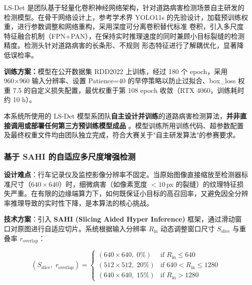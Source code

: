 \documentclass[UTF8, a4paper, fontset=ubuntu]{ctexart}
\begin{document}
  LS-Det 是团队基于轻量化卷积神经网络架构，针对道路病害检测场景自主研发的检测模型。在骨干网络设计上，参考学术界 YOLO11s 的先验设计\cite{lin2026yolo11wlbs}\cite{ultralytics2024}，加载预训练权重，进行参数调整和网络重构，采用深度可分离卷积替代标准
  卷积，引入多尺度特征融合机制（FPN+PAN）\cite{zhang2024steeldefect}，在保持实时推理速度的同时兼顾小目标裂缝的检测精度。检测头针对道路病害的长条形、不规则
  形态特征进行了解耦优化，显著降低误检率。

  \textbf{训练方案：}模型在公开数据集 RDD2022 \cite{arya2022rdd2022}\cite{alam2025crowd} 上训练，经过 180 个 epoch，采用 960×960 输入分辨率、设置 Patience=40 的早停策略以防止过拟合、box\_loss 权重 7.5 的自定义损失配置，最优权重于第 108 epoch 收敛（RTX 4060，训练耗时约 10 h）。                                                        
                  
  \bigskip
  \begin{tcolorbox}[
    colback=yellow!18,
    colframe=orange!60!black,
    fonttitle=\bfseries,
    title={赛事合规声明},
    left=6pt, right=6pt, top=4pt, bottom=4pt
  ]
  本系统所使用的 LS-Det 模型系团队\textbf{自主设计并训练}的道路病害检测算法，\textbf{并非直接调用或部署任何第三方预训练模型成品}
  。模型训练所用训练代码、超参数配置及最终权重文件均由团队独立完成，符合大赛关于"自主研发算法"的参赛要求。
  \end{tcolorbox}

\subsubsection{基于 SAHI 的自适应多尺度增强检测}

\textbf{设计难点}：行车记录仪及监控影像分辨率不固定。当原始图像直接缩放至检测器标准尺寸（$640\times640$）时，细微病害（如像素宽度 $<10$\,px 的裂缝）的纹理特征损失严重。在有限的边缘端算力下，如何既保证小目标的高召回率，又避免因全分辨率推理导致的实时性下降，是本算法的核心挑战。

\textbf{技术方案}：引入 \textbf{SAHI (Slicing Aided Hyper Inference)} 框架\cite{akyon2022sahi}，通过滑动窗口对原图进行自适应切片。系统根据输入分辨率 $R_{\text{in}}$ 动态调整窗口尺寸 $S_{\text{slice}}$ 与重叠率 $r_{\text{overlap}}$：

\begin{equation}
(S_{\text{slice}},\; r_{\text{overlap}}) = 
\begin{cases} 
(640\times640,\; 0\%) & \text{if } R_{\text{in}} \leq 640 \\
(512\times512,\; 20\%) & \text{if } 640 < R_{\text{in}} \leq 1280 \\
(640\times640,\; 15\%) & \text{if } R_{\text{in}} > 1280 
\end{cases}
\end{equation}
\end{document}
